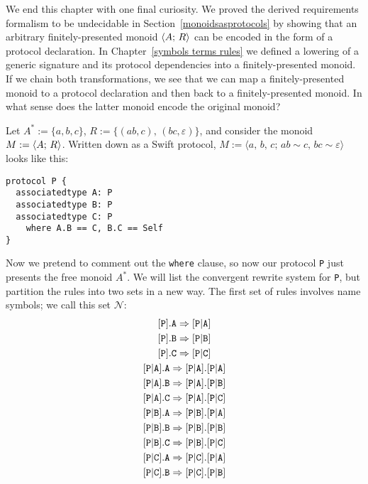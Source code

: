 \documentclass[../generics]{subfiles}
\begin{document}
\begin{example}\label{double encoding}
We end this chapter with one final curiosity. We proved the derived requirements formalism to be undecidable in Section~\ref{monoidsasprotocols} by showing that an arbitrary finitely-presented monoid $\langle A;\,R\rangle$ can be encoded in the form of a protocol declaration. In Chapter~\ref{symbols terms rules} we defined a lowering of a generic signature and its protocol dependencies into a finitely-presented monoid. If we chain both transformations, we see that we can map a finitely-presented monoid to a protocol declaration and then back to a finitely-presented monoid. In what sense does the latter monoid encode the original monoid?

Let $A^*:=\{a,b,c\}$, $R:=\{(ab,c),\,(bc,\varepsilon)\}$, and consider the monoid $M:=\langle A;\,R\rangle$. Written down as a Swift protocol, $M := \langle a,\,b,\,c;\,ab\sim c,\,bc\sim\varepsilon\rangle$ looks like this:
\begin{Verbatim}
protocol P {
  associatedtype A: P
  associatedtype B: P
  associatedtype C: P
    where A.B == C, B.C == Self
}
\end{Verbatim}
Now we pretend to comment out the \texttt{where} clause, so now our protocol \texttt{P} just presents the free monoid $A^*$. We will list the convergent rewrite system for \texttt{P}, but partition the rules into two sets in a new way. The first set of rules involves name symbols; we call this set $\mathcal{N}$:
\begin{gather*}
\AssocIntro{P}{A}\\
\AssocIntro{P}{B}\\
\AssocIntro{P}{C}\\
\assocsym{P}{A}.\texttt{A}\Rightarrow\assocsym{P}{A}.\assocsym{P}{A}\\
\assocsym{P}{A}.\texttt{B}\Rightarrow\assocsym{P}{A}.\assocsym{P}{B}\\
\assocsym{P}{A}.\texttt{C}\Rightarrow\assocsym{P}{A}.\assocsym{P}{C}\\
\assocsym{P}{B}.\texttt{A}\Rightarrow\assocsym{P}{B}.\assocsym{P}{A}\\
\assocsym{P}{B}.\texttt{B}\Rightarrow\assocsym{P}{B}.\assocsym{P}{B}\\
\assocsym{P}{B}.\texttt{C}\Rightarrow\assocsym{P}{B}.\assocsym{P}{C}\\
\assocsym{P}{C}.\texttt{A}\Rightarrow\assocsym{P}{C}.\assocsym{P}{A}\\
\assocsym{P}{C}.\texttt{B}\Rightarrow\assocsym{P}{C}.\assocsym{P}{B}\\

\end{gather*}
\end{example}
\end{document}
